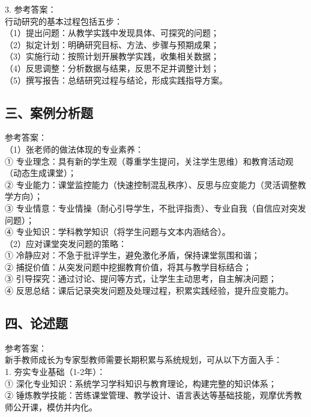 \documentclass[12pt,a4paper]{article}
\begin{document}
3. 参考答案：\\
行动研究的基本过程包括五步：\\
（1）提出问题：从教学实践中发现具体、可探究的问题；\\
（2）拟定计划：明确研究目标、方法、步骤与预期成果；\\
（3）实施行动：按照计划开展教学实践，收集相关数据；\\
（4）反思调整：分析数据与结果，反思不足并调整计划；\\
（5）撰写报告：总结研究过程与结论，形成实践指导方案。\\

\subsection{三、案例分析题}
参考答案：\\
（1）张老师的做法体现的专业素养：\\
① 专业理念：具有新的学生观（尊重学生提问，关注学生思维）和教育活动观（动态生成课堂）；\\
② 专业能力：课堂监控能力（快速控制混乱秩序）、反思与应变能力（灵活调整教学方向）；\\
③ 专业情意：专业情操（耐心引导学生，不批评指责）、专业自我（自信应对突发问题）；\\
④ 专业知识：学科教学知识（将学生问题与文本内涵结合）。\\

（2）应对课堂突发问题的策略：\\
① 冷静应对：不急于批评学生，避免激化矛盾，保持课堂氛围和谐；\\
② 捕捉价值：从突发问题中挖掘教育价值，将其与教学目标结合；\\
③ 引导探究：通过讨论、提问等方式，让学生主动思考，自主解决问题；\\
④ 反思总结：课后记录突发问题及处理过程，积累实践经验，提升应变能力。\\

\subsection{四、论述题}
参考答案：\\
新手教师成长为专家型教师需要长期积累与系统规划，可从以下方面入手：\\
1. 夯实专业基础（1-2年）：\\
① 深化专业知识：系统学习学科知识与教育理论，构建完整的知识体系；\\
② 锤炼教学技能：苦练课堂管理、教学设计、语言表达等基础技能，观摩优秀教师公开课，模仿并内化。\\
\end{document}
